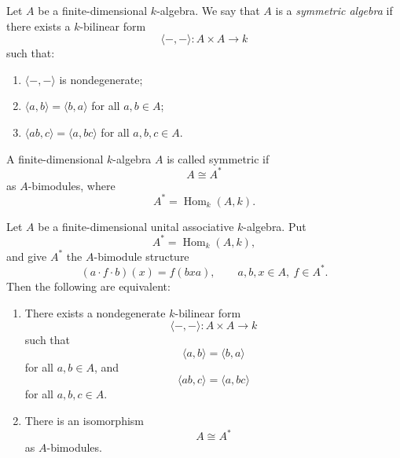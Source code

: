 \begin{definition}
    Let \(A\) be a finite-dimensional \(k\)-algebra. We say that \(A\) is a
    \emph{symmetric algebra} if there exists a \(k\)-bilinear form
    \[
        \langle -,-\rangle:A\times A\longrightarrow k
    \]
    such that:

    \begin{enumerate}
        \item \(\langle -,-\rangle\) is nondegenerate;
        \item \(\langle a,b\rangle=\langle b,a\rangle\) for all \(a,b\in A\);
        \item \(\langle ab,c\rangle=\langle a,bc\rangle\) for all \(a,b,c\in A\).
    \end{enumerate}
\end{definition}

\begin{definition}
    A finite-dimensional \(k\)-algebra \(A\) is called symmetric if
    \[
        A\cong A^*
    \]
    as \(A\)-bimodules, where
    \[
        A^*=\operatorname{Hom}_k(A,k).
    \]
\end{definition}

\begin{proposition}
    Let \(A\) be a finite-dimensional unital associative \(k\)-algebra. Put
    \[
        A^*=\operatorname{Hom}_k(A,k),
    \]
    and give \(A^*\) the \(A\)-bimodule structure
    \[
        (a\cdot f\cdot b)(x)
        =
        f(bxa),
        \qquad a,b,x\in A,\ f\in A^*.
    \]
    Then the following are equivalent:

    \begin{enumerate}
        \item[\textup{(i)}] There exists a nondegenerate \(k\)-bilinear form
              \[
                  \langle -,-\rangle:A\times A\longrightarrow k
              \]
              such that
              \[
                  \langle a,b\rangle=\langle b,a\rangle
              \]
              for all \(a,b\in A\), and
              \[
                  \langle ab,c\rangle=\langle a,bc\rangle
              \]
              for all \(a,b,c\in A\).

        \item[\textup{(ii)}] There is an isomorphism
              \[
                  A\cong A^*
              \]
              as \(A\)-bimodules.
    \end{enumerate}
\end{proposition}

